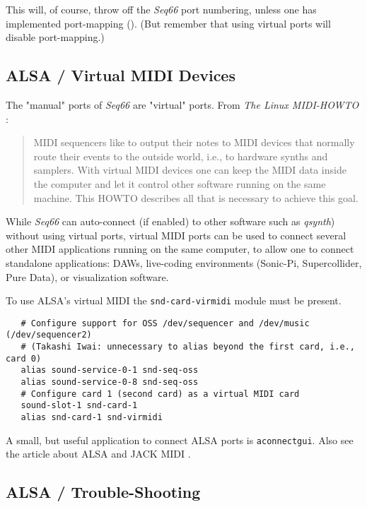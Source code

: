    This will, of course, throw off the \textsl{Seq66} port numbering, unless
   one has implemented port-mapping ().
   (But remember that using virtual ports will disable port-mapping.)

\subsection{ALSA / Virtual MIDI Devices}
\label{subsec:alsa_virtual_midi_devices}

   The "manual" ports of \textsl{Seq66} are "virtual" ports.
   From \textsl{The Linux MIDI-HOWTO} \cite{midihowto}:

   \begin{quote}
   MIDI sequencers like to output their notes to MIDI devices that normally
   route their events to the outside world, i.e., to hardware synths and
   samplers. With virtual MIDI devices one can keep the MIDI data inside the
   computer and let it control other software running on the same machine. This
   HOWTO describes all that is necessary to achieve this goal.
   \end{quote}

   While \textsl{Seq66} can auto-connect (if enabled) to other software
   such as \textsl{qsynth}) without using virtual ports, virtual MIDI
   ports can be used to connect several other MIDI applications running on the
   same computer, to allow one to connect standalone applications: DAWs,
   live-coding environments (Sonic-Pi, Supercollider, Pure Data), or
   visualization software.

   To use ALSA's virtual MIDI the
   \texttt{snd-card-virmidi} module must be present. 

   \begin{verbatim}
   # Configure support for OSS /dev/sequencer and /dev/music (/dev/sequencer2)
   # (Takashi Iwai: unnecessary to alias beyond the first card, i.e., card 0)
   alias sound-service-0-1 snd-seq-oss
   alias sound-service-0-8 snd-seq-oss
   # Configure card 1 (second card) as a virtual MIDI card
   sound-slot-1 snd-card-1
   alias snd-card-1 snd-virmidi
   \end{verbatim}

   A small, but useful application to connect ALSA ports
   is \texttt{aconnectgui}.
   Also see the article about ALSA and JACK MIDI \cite{midilinux}.

\subsection{ALSA / Trouble-Shooting}
\label{subsec:alsa_testing}


